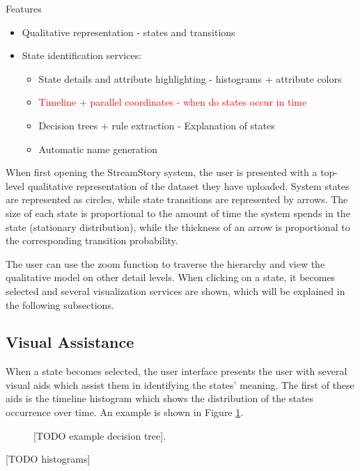 Features  
\begin{itemize}
	\item Qualitative representation - states and transitions
	\item State identification services:
	\begin{itemize}
		\item State details and attribute highlighting - histograms + attribute colors
		\item \textcolor{red}{Timeline + parallel coordinates - when do states occur in time}
		\item Decision trees + rule extraction - Explanation of states
		\item Automatic name generation
	\end{itemize}
\end{itemize}

When first opening the StreamStory system, the user is presented with a top-level qualitative representation
of the dataset they have uploaded. System states are represented as circles, while state transitions are
represented by arrows. The size of each state is proportional to the amount of time the system spends in
the state (stationary distribution), while the thickness of an arrow is proportional to the corresponding
transition probability.

The user can use the zoom function to traverse the hierarchy and view the qualitative model on other 
detail levels. When clicking on a state, it becomes selected and several visualization services are
shown, which will be explained in the following subsections.

\subsection{Visual Assistance}

When a state becomes selected, the user interface presents the user with several visual aids which
assist them in identifying the states' meaning. The first of these aids is the timeline histogram
which shows the distribution of the states occurrence over time. An example is shown in Figure 
\ref{fig:time-hist}.

\begin{figure}[h!]
	\centering
	\caption{[TODO example decision tree].}
	\label{fig:time-hist}
\end{figure}

[TODO histograms]

